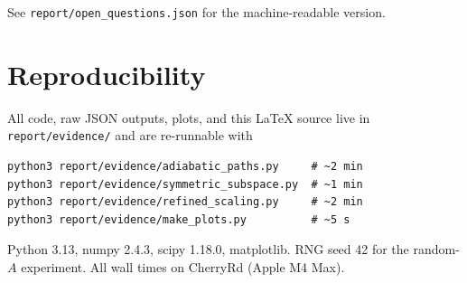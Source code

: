 \documentclass[11pt]{article}
\begin{document}
See \texttt{report/open\_questions.json} for the machine-readable version.

\section{Reproducibility}

All code, raw JSON outputs, plots, and this LaTeX source live in
\texttt{report/evidence/} and are re-runnable with

\begin{verbatim}
python3 report/evidence/adiabatic_paths.py     # ~2 min
python3 report/evidence/symmetric_subspace.py  # ~1 min
python3 report/evidence/refined_scaling.py     # ~2 min
python3 report/evidence/make_plots.py          # ~5 s
\end{verbatim}

Python 3.13, numpy 2.4.3, scipy 1.18.0, matplotlib. RNG seed 42 for the
random-$A$ experiment. All wall times on CherryRd (Apple M4 Max).
\end{document}
